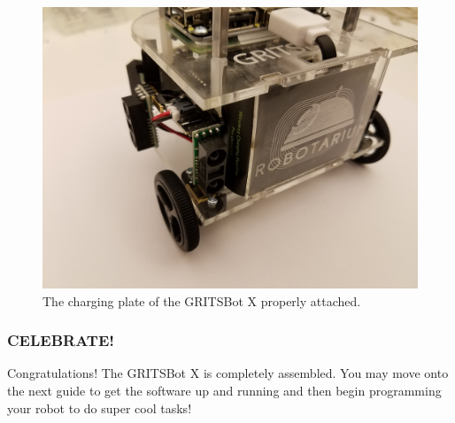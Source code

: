 \begin{figure}[h!]
\centering
\includegraphics[width=0.65\columnwidth, keepaspectratio]{./figs/20190110_133256.jpg}
\caption{The charging plate of the GRITSBot X properly attached.}
\label{fig:finishedBack}
\end{figure}


\subsubsection{CELEBRATE!}
\label{sec:CELEBRATE}

Congratulations! The GRITSBot X is completely assembled. You may move onto the next guide to get the software up and running and then begin programming your robot to do super cool tasks!